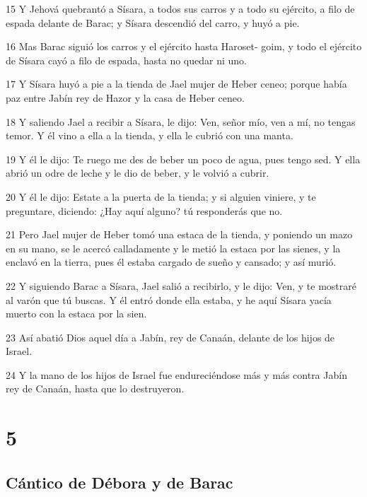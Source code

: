 \par 15 Y Jehová quebrantó a Sísara, a todos sus carros y a todo su ejército, a filo de espada delante de Barac; y Sísara descendió del carro, y huyó a pie.
\par 16 Mas Barac siguió los carros y el ejército hasta Haroset- goim, y todo el ejército de Sísara cayó a filo de espada, hasta no quedar ni uno.
\par 17 Y Sísara huyó a pie a la tienda de Jael mujer de Heber ceneo; porque había paz entre Jabín rey de Hazor y la casa de Heber ceneo.
\par 18 Y saliendo Jael a recibir a Sísara, le dijo: Ven, señor mío, ven a mí, no tengas temor. Y él vino a ella a la tienda, y ella le cubrió con una manta.
\par 19 Y él le dijo: Te ruego me des de beber un poco de agua, pues tengo sed. Y ella abrió un odre de leche y le dio de beber, y le volvió a cubrir.
\par 20 Y él le dijo: Estate a la puerta de la tienda; y si alguien viniere, y te preguntare, diciendo: ¿Hay aquí alguno? tú responderás que no.
\par 21 Pero Jael mujer de Heber tomó una estaca de la tienda, y poniendo un mazo en su mano, se le acercó calladamente y le metió la estaca por las sienes, y la enclavó en la tierra, pues él estaba cargado de sueño y cansado; y así murió.
\par 22 Y siguiendo Barac a Sísara, Jael salió a recibirlo, y le dijo: Ven, y te mostraré al varón que tú buscas. Y él entró donde ella estaba, y he aquí Sísara yacía muerto con la estaca por la sien.
\par 23 Así abatió Dios aquel día a Jabín, rey de Canaán, delante de los hijos de Israel.
\par 24 Y la mano de los hijos de Israel fue endureciéndose más y más contra Jabín rey de Canaán, hasta que lo destruyeron.

\chapter{5}

\section*{Cántico de Débora y de Barac}

